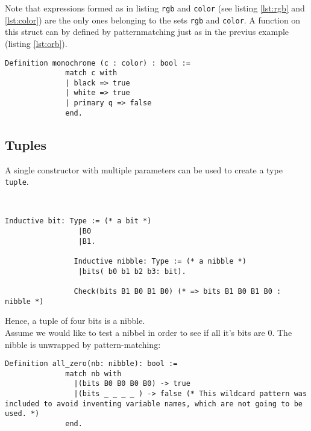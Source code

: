 		 Note that expressions formed as in listing \lstinline!rgb! and \lstinline!color! (see  listing \ref{lst:rgb} and  \ref{lst:color}) are the only ones belonging to the sets \lstinline!rgb! and \lstinline!color!.
		 A function on this struct can by defined by patternmatching just as in the previus example (listing \ref{lst:orb}).
		 \begin{lstlisting}[caption = \lstinline!monochrome! , label = lst:monochrome]
		 Definition monochrome (c : color) : bool :=
			  match c with
			  | black => true
			  | white => true
			  | primary q => false
			  end.
		 \end{lstlisting}


		 
	\subsection{Tuples}
	\label{subsec:tuples}
	
	    A single constructor with multiple parameters can be used to create a type \lstinline!tuple!.
		\begin{example}~\\\vspace{-10mm}
	 	 	{\normalfont 
	 	 	    \begin{lstlisting}[caption = \lstinline!bit! and \lstinline!nibbel!]
	 	 		Inductive bit: Type := (* a bit *) 
	 	 		 |B0
	 	 		 |B1.
	 	 		 
	 		    Inductive nibble: Type := (* a nibble *)
	 		   	 |bits( b0 b1 b2 b3: bit).
	 		   			 	
	 		   	Check(bits B1 B0 B1 B0) (* => bits B1 B0 B1 B0 : nibble *)
	 		\end{lstlisting}
	 		Hence, a tuple of four bits is a nibble.\\ 		
	 		Assume we would like to test a nibbel in order to see if all it's bits are 0. 
	 		The nibble is unwrapped by pattern-matching:
	 		\begin{lstlisting}[caption = \lstinline!all_zero!]
	 		Definition all_zero(nb: nibble): bool :=
	 		  match nb with
	 	  	    |(bits B0 B0 B0 B0) -> true
	 		    |(bits _ _ _ _ ) -> false (* This wildcard pattern was included to avoid inventing variable names, which are not going to be used. *) 
	 		  end.
	 		 \end{lstlisting}}
	 	\end{example}
	 	
